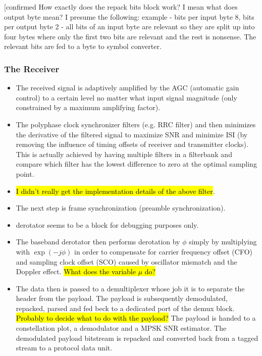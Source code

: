 \documentclass{article}
\begin{document}
\color{red}
[confirmed How exactly does the repack bits block work? I mean what does output byte mean? I presume the following: example - bits per input byte 8, bits per output byte 2 - all bits of an input byte are relevant so they are split up into four bytes where only the first two bits are relevant and the rest is nonsense. The relevant bits are fed to a byte to symbol converter.
\color{black}

\subsubsection{The Receiver}

\begin{itemize}
	\item The received signal is adaptively amplified by the AGC (automatic gain control) to a certain level no matter what input signal magnitude (only constrained by a maximum amplifying factor).
	\item The polyphase clock synchronizer filters (e.g. RRC filter) and then minimizes the derivative of the filtered signal to maximize SNR and minimize ISI (by removing the influence of timing offsets of receiver and transmitter clocks). This is actually achieved by having multiple filters in a filterbank and compare which filter has the lowest difference to zero at the optimal sampling point.
	\item \hl{I didn't really get the implementation details of the above filter}.
	\item The next step is frame synchronization (preamble synchronization).
	\item  derotator seems to be a block for debugging purposes only.
	\item  The baseband derotator then performs derotation by $\phi$ simply by multiplying with $\exp(-j\phi)$ in order to compensate for carrier frequency offset (CFO) and sampling clock offset (SCO) caused by oscillator mismatch and the Doppler effect. \hl{What does the variable $\mu$ do?}
	\item The data then is passed to a demultiplexer whose job it is to separate the header from the payload. The payload is subsequently demodulated, repacked, parsed and fed beck to a dedicated port of the demux block. \hl{Probably to decide what to do with the payload?} The payload is handed to a constellation plot, a demodulator and a MPSK SNR estimator. The demodulated payload bitstream is repacked and converted back from a tagged stream to a protocol data unit.
\end{itemize}
\end{document}
